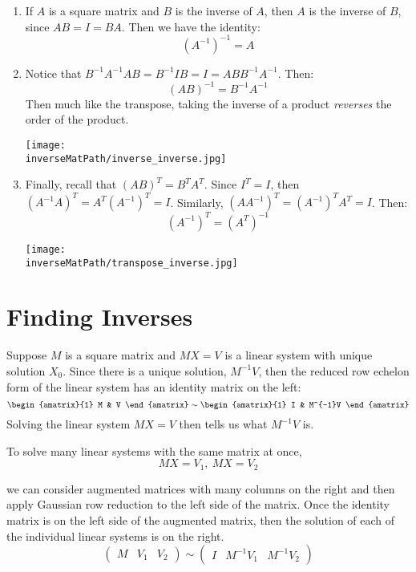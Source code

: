 \begin{enumerate}
\item If $A$ is a square matrix and $B$ is the inverse of $A$, then $A$ is the inverse of $B$, since $AB=I=BA$.  Then we have the identity:
\[
(A^{-1})^{-1}=A
\]

\item Notice that $B^{-1}A^{-1}AB=B^{-1}IB=I=ABB^{-1}A^{-1}$.
Then:
\[
(AB)^{-1}=B^{-1}A^{-1}
\]
Then much like the transpose, taking the inverse of a product \emph{reverses} the order of the product.


\begin{center}
\texttt{[image: \\inverseMatPath/inverse\_inverse.jpg]}
\end{center}

\item Finally, recall that $(AB)^T=B^TA^T$.  Since $I^T=I$, then $(A^{-1}A)^T=A^T(A^{-1})^T=I$.  Similarly, $(AA^{-1})^T=(A^{-1})^TA^T=I$.  Then:
\[
(A^{-1})^T=(A^T)^{-1}
\]
\begin{center}
\texttt{[image: \\inverseMatPath/transpose\_inverse.jpg]}
\end{center}
\end{enumerate}





\section{Finding Inverses}

Suppose $M$ is a square matrix and $MX=V$ is a linear system with unique solution $X_0$.  Since there is a unique solution, $M^{-1}V$, then the reduced row echelon form of the linear system has an identity matrix on the left:
\[
\begin{amatrix}{1}
M & V
\end{amatrix}
\sim
\begin{amatrix}{1}
I & M^{-1}V
\end{amatrix}
\]
Solving the linear system $MX=V$ then tells us what $M^{-1}V$ is.  

To solve many linear systems with the same matrix at once, 
\[MX=V_1,~MX=V_2\]

we can consider augmented matrices with 
many columns on the right 
 and then apply Gaussian row reduction to the left side of the matrix.  Once the identity matrix is on the left side of the augmented matrix, then the solution of each of the individual linear systems is on the right.
 \[
\left(\begin{array}{c|cc}
M & V_1&V_2
\end{array}\right)
\sim
\left(\begin{array}{c|cc}
I & M^{-1}V_1 & M^{-1}V_2
\end{array}\right)
\]


